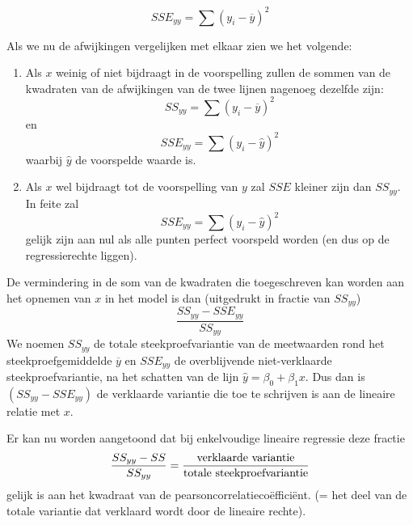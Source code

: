 \[ SSE_{yy} = \sum(y_{i} - \overline{y})^{2} \]

 Als we nu de afwijkingen vergelijken met elkaar zien we het volgende:
\begin{enumerate}
  \item Als $x$ weinig of niet bijdraagt in de voorspelling zullen de sommen van de kwadraten van de afwijkingen van de twee lijnen nagenoeg dezelfde zijn:
    \[ SS_{yy} = \sum(y_{i} - \overline{y})^{2} \] en
    \[ SSE_{yy} = \sum(y_{i} - \widehat{y})^{2} \]
    waarbij $\widehat{y}$ de voorspelde waarde is.
  \item Als $x$ wel bijdraagt tot de voorspelling van $y$ zal $SSE$ kleiner zijn dan $SS_{yy}$. In feite zal
    \[	SSE_{yy} = \sum(y_{i} - \widehat{y})^{2} \]
    gelijk zijn aan nul als alle punten perfect voorspeld worden (en dus op de regressierechte liggen).
\end{enumerate}

De vermindering in de som van de kwadraten die toegeschreven kan worden aan het opnemen van $x$ in het model is dan (uitgedrukt in fractie van $SS_{yy}$)
\[ \frac{SS_{yy} - SSE_{yy}}{SS_{yy}} \]
We noemen $SS_{yy}$ de totale steekproefvariantie van de meetwaarden rond het steekproefgemiddelde $\overline{y}$ en $SSE_{yy}$ de overblijvende niet-verklaarde steekproefvariantie, na het schatten van de lijn $\widehat{y} = \beta_{0} + \beta_{1}x$. Dus dan is $(SS_{yy} - SSE_{yy})$ de verklaarde variantie die toe te schrijven is aan de lineaire relatie met $x$.

Er kan nu worden aangetoond dat bij enkelvoudige lineaire regressie deze fractie
\[ \frac{SS_{yy} - SS}{SS_{yy}} = \frac{\textnormal{verklaarde variantie}}{\textnormal{totale steekproefvariantie}} \]
gelijk is aan het kwadraat van de pearsoncorrelatieco\"effici\"ent.  (= het deel van de totale variantie dat verklaard wordt door de lineaire rechte).


